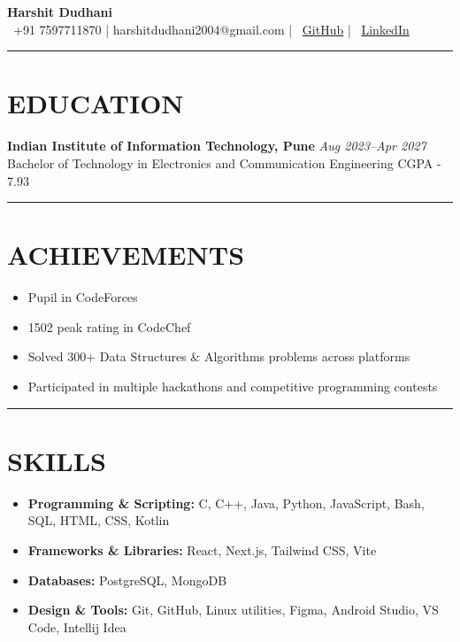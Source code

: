 \documentclass[11pt]{article}
\begin{document}
\begin{center}
    {\LARGE \textbf{Harshit Dudhani}} \\[0.25em]
    {\faPhone\ +91 7597711870} \quad | \quad
    harshitdudhani2004@gmail.com \quad | \quad
    {\faGithub\ \href{https://github.com/harshitdudhani}{GitHub}} \quad | \quad
    {\faLinkedin\ \href{https://www.linkedin.com/in/harshit-dudhani-777061297/}{LinkedIn}}
\end{center}

\vspace{0.4em}
\hrule
\vspace{0.8em}

\section*{EDUCATION}
\noindent
\textbf{Indian Institute of Information Technology, Pune} \hfill \textit{Aug 2023--Apr 2027}\\
Bachelor of Technology in Electronics and Communication Engineering \hfill CGPA - 7.93

\vspace{0.6em}
\hrule
\vspace{0.8em}

\section*{ACHIEVEMENTS}
\begin{itemize}[left=0pt,label=--]
  \item Pupil in CodeForces
  \item 1502 peak rating in CodeChef
  \item Solved 300+ Data Structures \& Algorithms problems across platforms
  \item Participated in multiple hackathons and competitive programming contests
\end{itemize}

\vspace{0.6em}
\hrule
\vspace{0.8em}

\section*{SKILLS}
\begin{itemize}[left=0pt,label=--]
  \item \textbf{Programming \& Scripting:} C, C++, Java, Python, JavaScript, Bash, SQL, HTML, CSS, Kotlin 
  \item \textbf{Frameworks \& Libraries:} React, Next.js, Tailwind CSS, Vite
  \item \textbf{Databases:} PostgreSQL, MongoDB
  \item \textbf{Design \& Tools:} Git, GitHub, Linux utilities, Figma, Android Studio, VS Code, Intellij Idea
\end{itemize}
\end{document}
